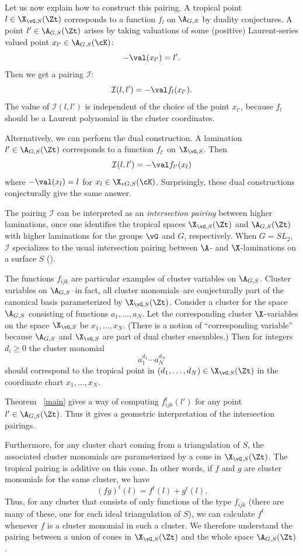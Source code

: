 Let us now explain how to construct this pairing. A tropical point $l \in \X_{\vG,S}(\Zt)$ corresponds to a function $f_l$ on $\A_{G,S}$ by duality conjectures. A point $l' \in \A_{G,S}(\Zt)$ arises by taking valuations of some (positive) Laurent-series valued point $x_{l'} \in \A_{G,S}(\cK)$:
\[
-\val(x_{l'}) = l'.
\]
Then we get a pairing $\mathcal{I}$:
\[
\mathcal{I}(l,l')=-\val f_l(x_{l'}).
\]
The value of $\mathcal{I}(l,l')$ is independent of the choice of the point $x_{l'}$, because $f_l$ should be a Laurent polynomial in the cluster coordinates.

Alternatively, we can perform the dual construction. A lamination $l' \in \A_{G,S}(\Zt)$ corresponds to a function $f_{l'}$ on $\X_{\vG,S}$. Then 
\[
\mathcal{I}(l,l')=-\val f_{l'}(x_{l})
\]
where $-\val(x_{l}) = l$ for $x_{l} \in \X_{vG,S}(\cK)$. Surprisingly, these dual constructions conjecturally give the same answer.

The pairing $\mathcal{I}$ can be interpreted as an \emph{intersection pairing} between higher laminations, once one identifies the tropical spaces $\X_{\vG,S}(\Zt)$ and $\A_{G,S}(\Zt)$ with higher laminations for the groups $\vG$ and $G$, respectively. When $G=SL_2$, $\mathcal{I}$ specializes to the usual intersection pairing between $\A$- and $\X$-laminations on a surface $S$ (\cite{FG1}).

The functions $f_{ijk}$ are particular examples of cluster variables on $\A_{G,S}$. Cluster variables on $\A_{G,S}$--in fact, all cluster monomials--are conjecturally part of the canonical basis parameterized by $\X_{\vG,S}(\Zt)$. Consider a cluster for the space $\A_{G,S}$ consisting of functions $a_1, \dots, a_N$. Let the corresponding cluster $\X$-variables on the space $\X_{\vG,S}$ be $x_1, \dots, x_N$. (There is a notion of ``corresponding variable'' because $\A_{G,S}$ and $\X_{\vG,S}$ are part of dual cluster ensembles.) Then for integers $d_i \geq 0$ the cluster monomial 
\[
a_1^{d_1} \cdots a_N^{d_N}
\]
should correspond to the tropical point in $(d_1, \dots, d_N) \in \X_{\vG,S}(\Zt)$ in the coordinate chart $x_1, \dots, x_N$.

Theorem ~\ref{main} gives a way of computing $f^t_{ijk}(l')$ for any point $l' \in \A_{G,S}(\Zt)$. Thus it gives a geometric interpretation of the intersection pairings. 

Furthermore, for any cluster chart coming from a triangulation of $S$, the associated cluster monomials are parameterized by a cone in $\X_{\vG,S}(\Zt)$. The tropical pairing is additive on this cone. In other words, if $f$ and $g$ are cluster monomials for the same cluster, we have
\[
(fg)^t(l) = f^t(l)+g^t(l).
\]
Thus, for any cluster that consists of only functions of the type $f_{ijk}$ (there are many of these, one for each ideal triangulation of $S$), we can calculate $f^t$ whenever $f$ is a cluster monomial in such a cluster. We therefore understand the pairing between a union of cones in $\X_{\vG,S}(\Zt)$ and the whole space $\A_{G,S}(\Zt)$.

